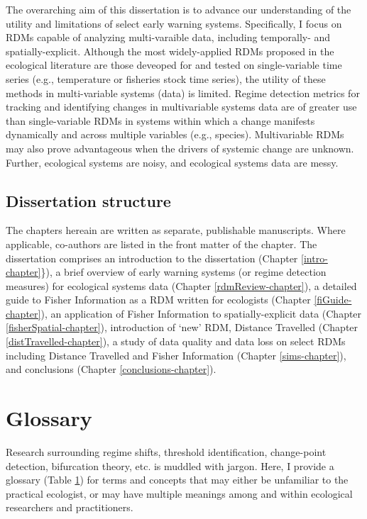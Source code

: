 \documentclass[12pt,twoside,openany]{reedthesis}
\begin{document}
The overarching aim of this dissertation is to advance our understanding of the utility and limitations of select early warning systems. Specifically, I focus on RDMs capable of analyzing multi-varaible data, including temporally- and spatially-explicit. Although the most widely-applied RDMs proposed in the ecological literature are those deveoped for and tested on single-variable time series (e.g., temperature or fisheries stock time series), the utility of these methods in multi-variable systems (data) is limited. Regime detection metrics for tracking and identifying changes in multivariable systems data are of greater use than single-variable RDMs in systems within which a change manifests dynamically and across multiple variables (e.g., species). Multivariable RDMs may also prove advantageous when the drivers of systemic change are unknown. Further, ecological systems are noisy, and ecological systems data are messy.

\hypertarget{dissertation-structure}{%
\subsection{Dissertation structure}\label{dissertation-structure}}

The chapters hereain are written as separate, publishable manuscripts. Where applicable, co-authors are listed in the front matter of the chapter. The dissertation comprises an introduction to the dissertation (Chapter \ref{intro-chapter}\}), a brief overview of early warning systems (or regime detection measures) for ecological systems data (Chapter \ref{rdmReview-chapter}), a detailed guide to Fisher Information as a RDM written for ecologists (Chapter \ref{fiGuide-chapter}), an application of Fisher Information to spatially-explicit data (Chapter \ref{fisherSpatial-chapter}), introduction of `new' RDM, Distance Travelled (Chapter \ref{distTravelled-chapter}), a study of data quality and data loss on select RDMs including Distance Travelled and Fisher Information (Chapter \ref{sims-chapter}), and conclusions (Chapter \ref{conclusions-chapter}).

\hypertarget{glossary}{%
\section{Glossary}\label{glossary}}

Research surrounding regime shifts, threshold identification, change-point detection, bifurcation theory, etc. is muddled with jargon. Here, I provide a glossary (Table \ref{glossary}) for terms and concepts that may either be unfamiliar to the practical ecologist, or may have multiple meanings among and within ecological researchers and practitioners.
\end{document}

